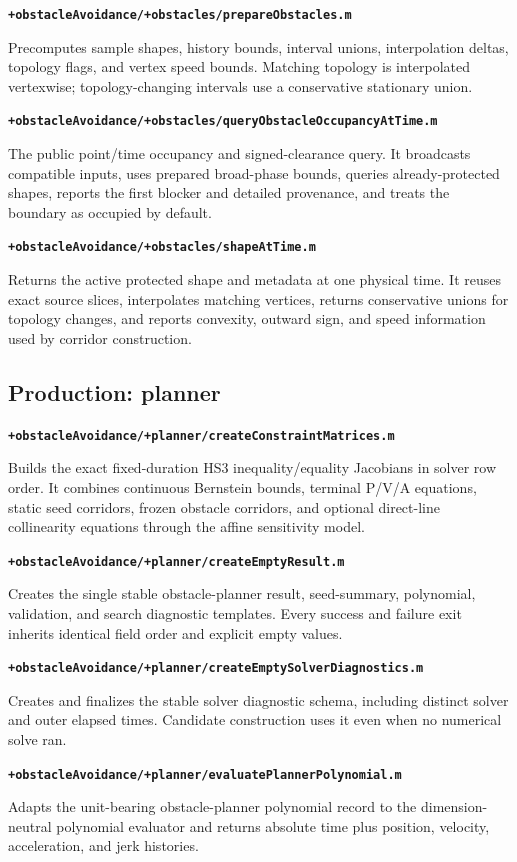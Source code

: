 \documentclass[10pt,letterpaper]{article}
\newcommand{\file}[1]{\nolinkurl{#1}}
\newcommand{\scriptentry}[2]{%
  \par\medskip\noindent\textbf{\file{#1}}\par
  \begingroup\raggedright #2\par\endgroup
}
\begin{document}
\scriptentry{+obstacleAvoidance/+obstacles/prepareObstacles.m}{Precomputes sample
shapes, history bounds, interval unions, interpolation deltas, topology flags,
and vertex speed bounds. Matching topology is interpolated vertexwise;
topology-changing intervals use a conservative stationary union.}

\scriptentry{+obstacleAvoidance/+obstacles/queryObstacleOccupancyAtTime.m}{The
public point/time occupancy and signed-clearance query. It broadcasts compatible
inputs, uses prepared broad-phase bounds, queries already-protected shapes,
reports the first blocker and detailed provenance, and treats the boundary as
occupied by default.}

\scriptentry{+obstacleAvoidance/+obstacles/shapeAtTime.m}{Returns the active
protected shape and metadata at one physical time. It reuses exact source
slices, interpolates matching vertices, returns conservative unions for
topology changes, and reports convexity, outward sign, and speed information
used by corridor construction.}

\subsection{Production: planner}

\scriptentry{+obstacleAvoidance/+planner/createConstraintMatrices.m}{Builds the
exact fixed-duration HS3 inequality/equality Jacobians in solver row order. It
combines continuous Bernstein bounds, terminal P/V/A equations, static seed
corridors, frozen obstacle corridors, and optional direct-line collinearity
equations through the affine sensitivity model.}

\scriptentry{+obstacleAvoidance/+planner/createEmptyResult.m}{Creates the single
stable obstacle-planner result, seed-summary, polynomial, validation, and search
diagnostic templates. Every success and failure exit inherits identical field
order and explicit empty values.}

\scriptentry{+obstacleAvoidance/+planner/createEmptySolverDiagnostics.m}{Creates
and finalizes the stable solver diagnostic schema, including distinct solver
and outer elapsed times. Candidate construction uses it even when no numerical
solve ran.}

\scriptentry{+obstacleAvoidance/+planner/evaluatePlannerPolynomial.m}{Adapts the
unit-bearing obstacle-planner polynomial record to the dimension-neutral
polynomial evaluator and returns absolute time plus position, velocity,
acceleration, and jerk histories.}
\end{document}
